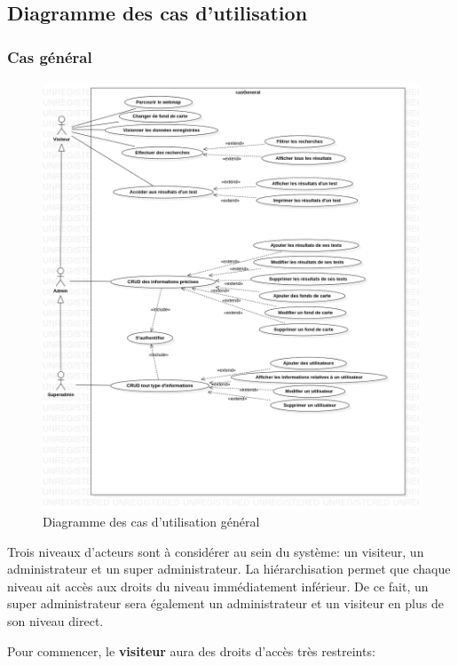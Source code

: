 \subsection{Diagramme des cas d'utilisation}
    \subsubsection{Cas général}
    \paragraph{}
    \begin{figure}
        \centering
        \includegraphics[width=1\textwidth]{casGeneral.png}
        \caption{Diagramme des cas d'utilisation général}
    \end{figure}
    Trois niveaux d'acteurs sont à considérer au sein du système: un visiteur, 
    un administrateur et un super administrateur. La hiérarchisation permet que 
    chaque niveau ait accès aux droits du niveau immédiatement inférieur. 
    De ce fait, un super administrateur sera également un administrateur et 
    un visiteur en plus de son niveau direct. \par 
Pour commencer, le \textbf{visiteur} aura des droits d'accès très restreints: \par 

